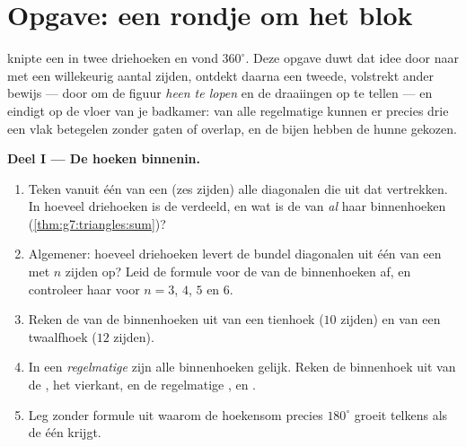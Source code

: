 \section{Opgave: een rondje om het blok}

\begin{problem}
\label{pb:g7:triangles:1}
 knipte een  in twee driehoeken en vond
$360^\circ$. Deze opgave duwt dat idee door naar  met een willekeurig
aantal zijden, ontdekt daarna een tweede, volstrekt ander bewijs --- door om de
figuur \emph{heen te lopen} en de draaiingen op te tellen --- en eindigt op de vloer
van je badkamer: van alle regelmatige  kunnen er precies drie een vlak
betegelen zonder gaten of overlap, en de bijen hebben de hunne gekozen.

\medskip
\noindent\textbf{Deel I --- De hoeken binnenin.}
\begin{enumerate}
  \item Teken vanuit één  van een  (zes zijden) alle diagonalen die
        uit dat  vertrekken. In hoeveel driehoeken is de  verdeeld,
        en wat is de  van \emph{al} haar binnenhoeken
        (\cref{thm:g7:triangles:sum})?
  \item Algemener: hoeveel driehoeken levert de bundel diagonalen uit één 
        van een  met $n$ zijden op? Leid de formule voor de  van de
        binnenhoeken af, en controleer haar voor $n = 3$, $4$, $5$ en $6$.
  \item Reken de  van de binnenhoeken uit van een tienhoek ($10$ zijden) en van
        een twaalfhoek ($12$ zijden).
  \item In een \emph{regelmatige}  zijn alle binnenhoeken gelijk. Reken de
        binnenhoek uit van de , het vierkant, en de
        regelmatige ,  en .
  \item Leg zonder formule uit waarom de hoekensom precies $180^\circ$ groeit
        telkens als de  één  krijgt.
\end{enumerate}


\end{problem}
